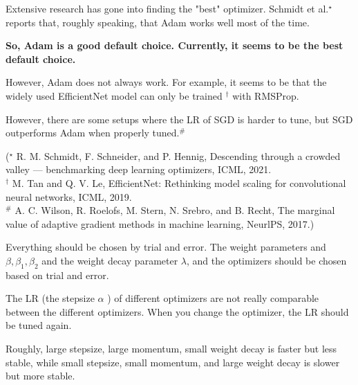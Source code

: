 \begin{concept}
    Extensive research has gone into finding the "best" optimizer. Schmidt et al.${ }^{\star}$ reports that, roughly speaking, that Adam works well most of the time.

    \textbf{So, Adam is a good default choice. Currently, it seems to be the best default choice.}

    However, Adam does not always work. For example, it seems to be that the widely used EfficientNet model can only be trained ${ }^{\dagger}$ with RMSProp.

    However, there are some setups where the LR of SGD is harder to tune, but SGD outperforms Adam when properly tuned.${ }^{\#}$

    (${ }^{\star}$ R. M. Schmidt, F. Schneider, and P. Hennig, Descending through a crowded valley — benchmarking deep learning optimizers, ICML, 2021.\\
    ${ }^{\dagger}$ M. Tan and Q. V. Le, EfficientNet: Rethinking model scaling for convolutional neural networks, ICML, 2019.\\
    ${ }^{\#}$ A. C. Wilson, R. Roelofs, M. Stern, N. Srebro, and B. Recht, The marginal value of adaptive gradient methods in machine learning, NeurlPS, 2017.)
\end{concept}

\begin{concept}
    Everything should be chosen by trial and error. The weight parameters and $\beta, \beta_{1}, \beta_{2}$ and the weight decay parameter $\lambda$, and the optimizers should be chosen based on trial and error.

    The LR (the stepsize $\alpha$ ) of different optimizers are not really comparable between the different optimizers. When you change the optimizer, the LR should be tuned again.

    Roughly, large stepsize, large momentum, small weight decay is faster but less stable, while small stepsize, small momentum, and large weight decay is slower but more stable.
\end{concept}


